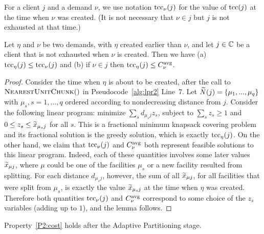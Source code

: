 \documentclass[11pt]{article}
\begin{document}

For a client $j$ and a demand $\nu$, we use notation $\textrm{tcc}_{\nu}(j)$ for the value of
$\textrm{tcc}(j)$ at the time when $\nu$ was created. (It is not necessary that $\nu\in j$ but $j$ is not exhausted at that time.)


\begin{lemma}\label{lem: tcc optimal}
  Let $\eta$ and $\nu$ be two demands, with $\eta$ created
  earlier than $\nu$, and let $j\in\mathbb{C}$ be a client
  that is not exhausted when $\nu$ is created. Then we have
  (a) $\textrm{tcc}_\eta(j) \le \textrm{tcc}_{\nu}(j)$ and (b) if $\nu\in j$
  then $\textrm{tcc}_\eta(j) \le C^{{\mbox{\scriptsize\rm avg}}}_{\nu}$.
\end{lemma}

\begin{proof}
  Consider the time when $\eta$ is about to be created,
  after the call to ${\textsc{NearestUnitChunk}}()$ in
  Pseudocode~\ref{alg:lpr2} Line~7.  Let ${\widetilde N}(j) =
  \{\mu_1,...,\mu_q\}$ with $\mu_s, s=1,\ldots,q$ ordered
  according to nondecreasing distance from $j$.  Consider
  the following linear program: minimize $\sum_s d_{\mu_s j}
  z_s$, subject to $\sum_s z_s \ge 1$ and $0 \le z_s \le
  {\widetilde x}_{\mu_s j}$ for all $s$.  This is a fractional
  minimum knapsack covering problem and its fractional
  solution is the greedy solution, which is exactly
  $\textrm{tcc}_\eta(j)$.  On the other hand, we claim that
  $\textrm{tcc}_\nu(j)$ and $C^{{\mbox{\scriptsize\rm avg}}}_{\nu}$ both represent feasible
  solutions to this linear program. Indeed, each of these
  quantities involves some later values ${\widetilde x}_{\mu j}$,
  where $\mu$ could be one of the facilities $\mu_s$ or a
  new facility resulted from splitting. For each distance
  $d_{\mu_s j}$, however, the sum of all ${\widetilde x}_{\mu j}$,
  for all facilities that were split from $\mu_s$, is
  exactly the value ${\widetilde x}_{\mu_s j}$ at the time when
  $\eta$ was created.  Therefore both quantities
  $\textrm{tcc}_\nu(j)$ and $C^{{\mbox{\scriptsize\rm avg}}}_{\nu}$ correspond to some
  choice of the $z_s$ variables (adding up to $1$), and the
  lemma follows.
\end{proof}


\begin{lemma}\label{lem: property P2:cost holds}
Property~\ref{P2:cost} holds after the Adaptive Partitioning stage.
\end{lemma}
\end{document}
